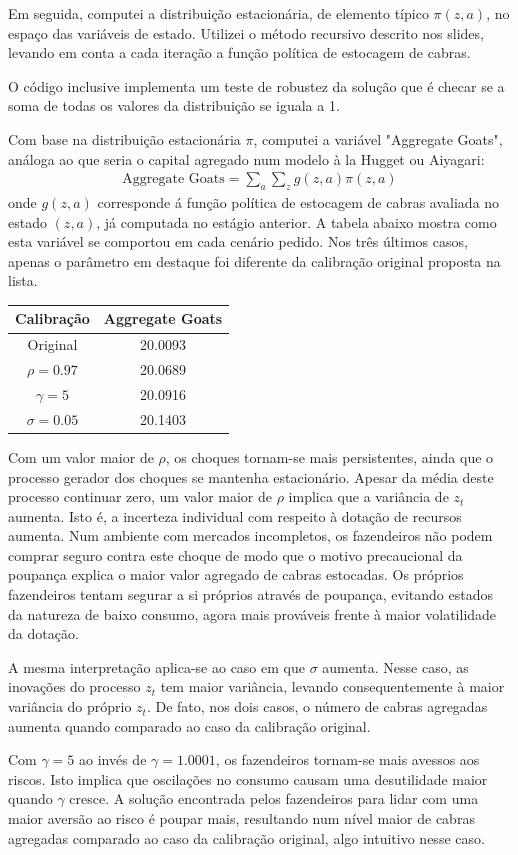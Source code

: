 \documentclass[11pt]{article}
\theoremstyle{definition}
\theoremstyle{solution}
\begin{document}
Em seguida, computei a distribuição estacionária, de elemento típico $\pi(z, a)$, no espaço das variáveis de estado. Utilizei o método recursivo descrito nos slides, levando em conta a cada iteração a função política de estocagem de cabras.

O código inclusive implementa um teste de robustez da solução que é checar se a soma de todas os valores da distribuição se iguala a 1.

Com base na distribuição estacionária $\pi$, computei a variável "Aggregate Goats", análoga ao que seria o capital agregado num modelo à la Hugget ou Aiyagari:
\begin{gather*}
	\text{Aggregate Goats} = \sum\limits_{a}\sum\limits_{z}g(z,a)\pi(z,a)
\end{gather*}
onde $g(z,a)$ corresponde á função política de estocagem de cabras avaliada no estado $(z,a)$, já computada no estágio anterior. A tabela abaixo mostra como esta variável se comportou em cada cenário pedido. Nos três últimos casos, apenas o parâmetro em destaque foi diferente da calibração original proposta na lista.
\begin{center}
	\begin{tabular}{c|c}
	Calibração & Aggregate Goats\\
	\hline
	\hline
	Original & 20.0093\\
	$\rho = 0.97$ & 20.0689\\
	$\gamma = 5$ & 20.0916\\
	$\sigma = 0.05$ & 20.1403
\end{tabular}
\end{center}
Com um valor maior de $\rho$, os choques tornam-se mais persistentes, ainda que o processo gerador dos choques se mantenha estacionário. Apesar da média deste processo continuar zero, um valor maior de $\rho$ implica que a variância de $z_{t}$ aumenta. Isto é, a incerteza individual com respeito à dotação de recursos aumenta. Num ambiente com mercados incompletos, os fazendeiros não podem comprar seguro contra este choque de modo que o motivo precaucional da poupança explica o maior valor agregado de cabras estocadas. Os próprios fazendeiros tentam segurar a si próprios através de poupança, evitando estados da natureza de baixo consumo, agora mais prováveis frente à maior volatilidade da dotação.

A mesma interpretação aplica-se ao caso em que $\sigma$ aumenta. Nesse caso, as inovações do processo $z_{t}$ tem maior variância, levando consequentemente à maior variância do próprio $z_{t}$. De fato, nos dois casos, o número de cabras agregadas aumenta quando comparado ao caso da calibração original.

Com $\gamma = 5$ ao invés de $\gamma = 1.0001$, os fazendeiros tornam-se mais avessos aos riscos. Isto implica que oscilações no consumo causam uma desutilidade maior quando $\gamma$ cresce. A solução encontrada pelos fazendeiros para lidar com uma maior aversão ao risco é poupar mais, resultando num nível maior de cabras agregadas comparado ao caso da calibração original, algo intuitivo nesse caso.
\end{document}
